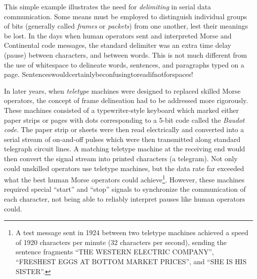 This simple example illustrates the need for \textit{delimiting} in serial data communication.  Some means must be employed to distinguish individual groups of bits (generally called \textit{frames} or \textit{packets}) from one another, lest their meanings be lost.  In the days when human operators sent and interpreted Morse and Continental code messages, the standard delimiter was an extra time delay (pause) between characters, and between words.  This is not much different from the use of whitespace to delineate words, sentences, and paragraphs typed on a page.  Sentenceswouldcertainlybeconfusingtoreadifnotforspaces!

In later years, when \textit{teletype} machines were designed to replaced skilled Morse operators, the concept of frame delineation had to be addressed more rigorously.  These machines consisted of a typewriter-style keyboard which marked either paper strips or pages with dots corresponding to a 5-bit code called the \textit{Baudot code}.  The paper strip or sheets were then read electrically and converted into a serial stream of on-and-off pulses which were then transmitted along standard telegraph circuit lines.  A matching teletype machine at the receiving end would then convert the signal stream into printed characters (a telegram).  Not only could unskilled operators use teletype machines, but the data rate far exceeded what the best human Morse operators could achieve\footnote{A test message sent in 1924 between two teletype machines achieved a speed of 1920 characters per minute (32 characters per second), sending the sentence fragments ``THE WESTERN ELECTRIC COMPANY'', ``FRESHEST EGGS AT BOTTOM MARKET PRICES'', and ``SHE IS HIS SISTER''.}.  However, these machines required special ``start'' and ``stop'' signals to synchronize the communication of each character, not being able to reliably interpret pauses like human operators could.  

